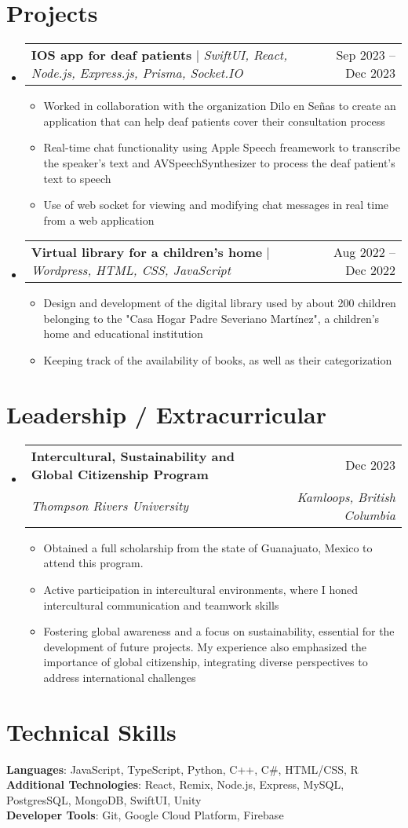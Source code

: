 \documentclass[letterpaper,11pt]{article}
\makeatletter
\newcommand{\resumeItem}[1]{
    \item\small{
            {#1 \vspace{-2pt}}
    }
}
\newcommand{\resumeSubheading}[4]{
    \vspace{-2pt}\item
    \begin{tabular*}{0.97\textwidth}[t]{l@{\extracolsep{\fill}}r}
        \textbf{#1} & #2 \\
        \textit{\small#3} & \textit{\small #4} \\
    \end{tabular*}\vspace{-7pt}
}
\newcommand{\resumeProjectHeading}[2]{
    \item
    \begin{tabular*}{0.97\textwidth}{l@{\extracolsep{\fill}}r}
        \small#1 & #2 \\
    \end{tabular*}\vspace{-7pt}
}
\newcommand{\resumeSubHeadingListStart}{\begin{itemize}[leftmargin=0.15in, label={}]}
\newcommand{\resumeSubHeadingListEnd}{\end{itemize}}
\newcommand{\resumeItemListStart}{\begin{itemize}}
\newcommand{\resumeItemListEnd}{\end{itemize}\vspace{-5pt}}
\makeatother
\begin{document}
\section{Projects}
\resumeSubHeadingListStart
\resumeProjectHeading
{\textbf{IOS app for deaf patients} $|$ \emph{SwiftUI, React, Node.js, Express.js, Prisma, Socket.IO }}{Sep 2023 -- Dec 2023}
\resumeItemListStart
\resumeItem{Worked in collaboration with the organization Dilo en Señas to create an application that can help deaf patients cover their consultation process}
\resumeItem{Real-time chat functionality using Apple Speech freamework to transcribe the speaker's text and AVSpeechSynthesizer to process the deaf patient's text to speech}
\resumeItem{Use of web socket for viewing and modifying chat messages in real time from a web application}
\resumeItemListEnd
\resumeProjectHeading
{\textbf{Virtual library for a children's home} $|$ \emph{Wordpress, HTML, CSS, JavaScript }}{Aug 2022 -- Dec 2022}
\resumeItemListStart
\resumeItem{Design and development of the digital library used by about 200 children belonging to the "Casa Hogar Padre Severiano Martínez", a children's home and educational institution}
\resumeItem{Keeping track of the availability of books, as well as their categorization}
\resumeItemListEnd
\resumeSubHeadingListEnd



\section{Leadership / Extracurricular}
\resumeSubHeadingListStart
\resumeSubheading
{Intercultural, Sustainability and Global Citizenship Program
}{Dec 2023}
{Thompson Rivers University}{Kamloops, British Columbia}
\resumeItemListStart
\resumeItem{Obtained a full scholarship from the state of Guanajuato, Mexico to attend this program. }
\resumeItem{Active participation in intercultural environments, where I honed intercultural communication and teamwork skills}
\resumeItem{Fostering global awareness and a focus on sustainability, essential for the development of future projects. My experience also emphasized the importance of global citizenship, integrating diverse perspectives to address international challenges}
\resumeItemListEnd

\resumeSubHeadingListEnd


\section{Technical Skills}
\begin{itemize}[leftmargin=0.15in, label={}]
\small{\item{
\textbf{Languages}{: JavaScript, TypeScript, Python, C++, C\#, HTML/CSS, R} \\
\textbf{Additional Technologies}{: React, Remix, Node.js, Express, MySQL, PostgresSQL, MongoDB, SwiftUI, Unity} \\
\textbf{Developer Tools}{: Git, Google Cloud Platform, Firebase} \\
}}
\end{itemize}

\end{document}
